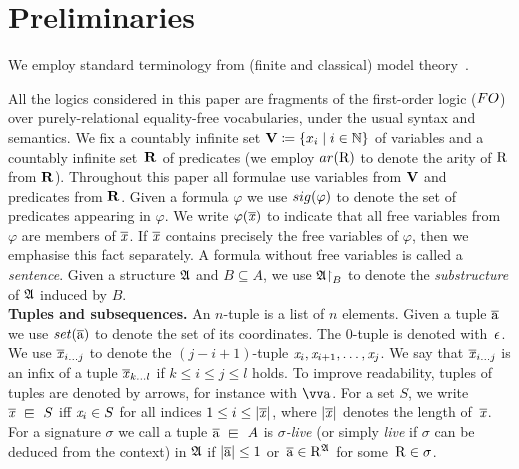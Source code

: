 
\section{Preliminaries}\label{sec:preliminaries}
We employ standard terminology from (finite and classical) model theory~\cite[Sec. 1--3]{Libkin04}.

All the logics considered in this paper are fragments of the first-order logic ($\FO$) over purely-relational equality-free vocabularies, under the usual syntax and semantics. 
We fix a countably infinite set $\mathbf{V} \coloneqq \{x_i \mid i \in {\mathbb{N}}\}$ of variables and a countably infinite set~$\mathbf{R}$ of predicates (we employ $\arity(\relR)$ to denote the arity of $\mathrm{R}$ from $\mathbf{R}$). 
Throughout this paper all formulae use variables from $\mathbf{V}$ and predicates from $\mathbf{R}$.
Given a formula $\varphi$ we use $\sig(\varphi)$ to denote the set of predicates appearing in $\varphi$. 
We write $\varphi(\overline{\mathit{x}})$ to indicate that all free variables from $\varphi$ are members of $\overline{\mathit{x}}$. 
If $\overline{\mathit{x}}$ contains precisely the free
variables of $\varphi$, then we emphasise this fact separately.
A formula without free variables is called a \emph{sentence}.
Given a structure ${\mathfrak{A}}$ and $B \subseteq A$, we use ${\mathfrak{A}}\mathord{\upharpoonright}_{B}$ to denote the \emph{substructure} of ${\mathfrak{A}}$ induced by $B$.\\

\noindent \textbf{Tuples and subsequences.}
An $n$-tuple is a list of $n$ elements.
Given a tuple $\overline{\mathrm{a}}$ we use $\set(\elemtuplea)$ to denote the set of its coordinates.
The $0$-tuple is denoted with~$\epsilon$.
We use $\overline{\mathit{x}}_{i\ldots j}$ to denote the $(j{-}i{+}1)$-tuple $\mathit{x}_i, \mathit{x}_{i+1}, \ldots, \mathit{x}_j$.
We say that $\overline{\mathit{x}}_{i\ldots j}$ is an infix of a tuple $\overline{\mathit{x}}_{k\ldots l}$ if $k \leq i \leq j \leq l$ holds. 
To improve readability, tuples of tuples are denoted by arrows, for instance with $\elemtuptuplea$.
For a set $S$, we write $\vartuplex \sqin S$ iff $\mathit{x}_i \in S$ for all indices $1 \leq i \leq |\overline{\mathit{x}}|$, where $|\overline{\mathit{x}}|$ denotes the length of~$\overline{\mathit{x}}$. 
For a signature $\sigma$ we call a tuple $\elemtuplea \sqin A$ is \emph{$\sigma$-live} (or simply \emph{live} if $\sigma$ can be deduced from the context) in ${\mathfrak{A}}$ if $|\overline{\mathrm{a}}| \leq 1$ or~$\overline{\mathrm{a}} \in \mathrm{R}^{{\mathfrak{A}}}$ for some~$\mathrm{R} \in \sigma$.\\ 

